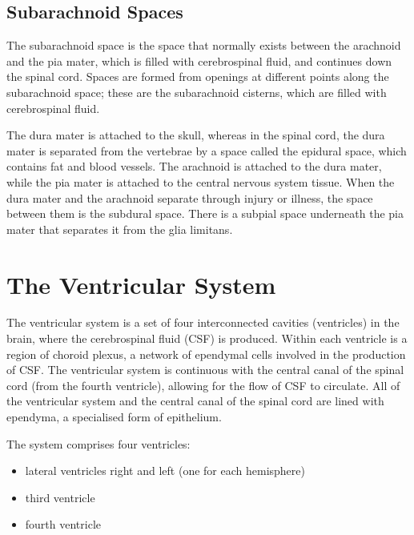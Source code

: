 \hypertarget{subarachnoid-spaces}{%
\subsection{Subarachnoid Spaces}\label{subarachnoid-spaces}}

The subarachnoid space is the space that normally exists between the arachnoid and the pia mater, which is filled with cerebrospinal fluid, and continues down the spinal cord. Spaces are formed from openings at different points along the subarachnoid space; these are the subarachnoid cisterns, which are filled with cerebrospinal fluid.

The dura mater is attached to the skull, whereas in the spinal cord, the dura mater is separated from the vertebrae by a space called the epidural space, which contains fat and blood vessels. The arachnoid is attached to the dura mater, while the pia mater is attached to the central nervous system tissue. When the dura mater and the arachnoid separate through injury or illness, the space between them is the subdural space. There is a subpial space underneath the pia mater that separates it from the glia limitans.

\hypertarget{the-ventricular-system}{%
\section{The Ventricular System}\label{the-ventricular-system}}

The ventricular system is a set of four interconnected cavities (ventricles) in the brain, where the cerebrospinal fluid (CSF) is produced. Within each ventricle is a region of choroid plexus, a network of ependymal cells involved in the production of CSF. The ventricular system is continuous with the central canal of the spinal cord (from the fourth ventricle), allowing for the flow of CSF to circulate. All of the ventricular system and the central canal of the spinal cord are lined with ependyma, a specialised form of epithelium.

The system comprises four ventricles:

\begin{itemize}
\tightlist
\item
  lateral ventricles right and left (one for each hemisphere)
\item
  third ventricle
\item
  fourth ventricle
\end{itemize}



